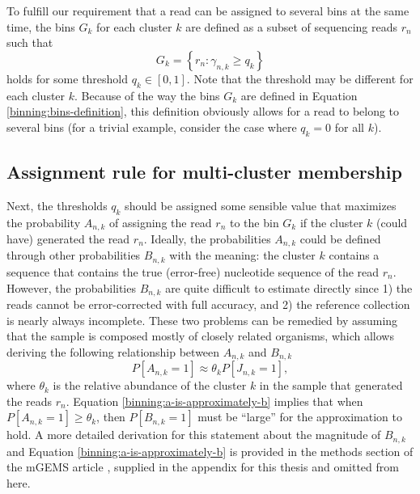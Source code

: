 \documentclass[officiallayout]{tktla}
\begin{document}
To fulfill our requirement that a read can be assigned to several bins
at the same time, the bins $G_{k}$ for each cluster $k$ are defined as
a subset of sequencing reads $r_{n}$ such that
\begin{equation}
  \label{binning:bins-definition}
  G_{k} = \left\{r_{n} : \gamma_{n, k} \geq q_{k}\right\}
\end{equation}
holds for some threshold $q_{k} \in \left[0, 1\right]$. Note that the
threshold may be different for each cluster $k$. Because of the way
the bins $G_{k}$ are defined in Equation
\eqref{binning:bins-definition}, this definition obviously allows for
a read to belong to several bins (for a trivial example, consider
the case where $q_{k} = 0$ for all $k$).

\subsection{Assignment rule for multi-cluster membership}

Next, the thresholds $q_{k}$ should be assigned some sensible value
that maximizes the probability $A_{n, k}$ of assigning the read
$r_{n}$ to the bin $G_{k}$ if the cluster $k$ (could have) generated
the read $r_{n}$. Ideally, the probabilities $A_{n, k}$ could be
defined through other probabilities $B_{n, k}$ with the meaning: the
cluster $k$ contains a sequence that contains the true (error-free)
nucleotide sequence of the read $r_{n}$. However, the probabilities
$B_{n, k}$ are quite difficult to estimate directly since 1) the reads
cannot be error-corrected with full accuracy, and 2) the reference
collection is nearly always incomplete. These two problems can be
remedied by assuming that the sample is composed mostly of closely
related organisms, which allows deriving the following relationship
between $A_{n, k}$ and $B_{n, k}$
\begin{equation}
  \label{binning:a-is-approximately-b}
  P\left[A_{n, k} = 1\right] \approx \theta_{k}P\left[J_{n, k} = 1\right],
\end{equation}
where $\theta_k$ is the relative abundance of the cluster $k$ in the
sample that generated the reads $r_{n}$. Equation
\eqref{binning:a-is-approximately-b} implies that when $P\left[A_{n, k}
  = 1\right] \geq \theta_{k}$, then $P\left[B_{n, k} = 1\right]$ must
be ``large'' for the approximation to hold. A more detailed derivation
for this statement about the magnitude of $B_{n, k}$ and Equation
\eqref{binning:a-is-approximately-b} is provided in the methods section
of the mGEMS article \citep{maklin_bacterial_2021}, supplied in the
appendix for this thesis and omitted from here.
\end{document}
